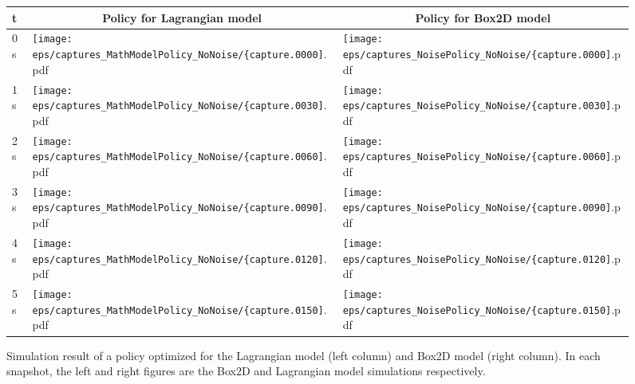 \documentclass[letterpaper, 10 pt, conference]{ieeeconf}
\begin{document}
\setlength{\figw}{33mm}
\begin{figure}[tb]
\begin{center}
\begin{tabular}{|l|m{\figw}|m{\figw}|}
\hline
t & \multicolumn{1}{c|}{\footnotesize Policy for Lagrangian model} 
 & \multicolumn{1}{c|}{\footnotesize Policy for Box2D model}\\\hline
0s &
\texttt{[image: eps/captures\_MathModelPolicy\_NoNoise/\{capture.0000]}.pdf} &
\texttt{[image: eps/captures\_NoisePolicy\_NoNoise/\{capture.0000]}.pdf}\\
1s &
\texttt{[image: eps/captures\_MathModelPolicy\_NoNoise/\{capture.0030]}.pdf} &
\texttt{[image: eps/captures\_NoisePolicy\_NoNoise/\{capture.0030]}.pdf}\\
2s &
\texttt{[image: eps/captures\_MathModelPolicy\_NoNoise/\{capture.0060]}.pdf} &
\texttt{[image: eps/captures\_NoisePolicy\_NoNoise/\{capture.0060]}.pdf}\\
3s &
\texttt{[image: eps/captures\_MathModelPolicy\_NoNoise/\{capture.0090]}.pdf} &
\texttt{[image: eps/captures\_NoisePolicy\_NoNoise/\{capture.0090]}.pdf}\\
4s &
\texttt{[image: eps/captures\_MathModelPolicy\_NoNoise/\{capture.0120]}.pdf} &
\texttt{[image: eps/captures\_NoisePolicy\_NoNoise/\{capture.0120]}.pdf}\\
5s &
\texttt{[image: eps/captures\_MathModelPolicy\_NoNoise/\{capture.0150]}.pdf} &
\texttt{[image: eps/captures\_NoisePolicy\_NoNoise/\{capture.0150]}.pdf}\\\hline
\end{tabular}
\caption{Simulation result of a policy optimized for the Lagrangian
 model (left column) and Box2D model (right column).  In each snapshot,
 the left and right figures are the Box2D and Lagrangian model
 simulations respectively.}
\label{fig:learning_example-math-sim}
\end{center}
\end{figure}
\end{document}
